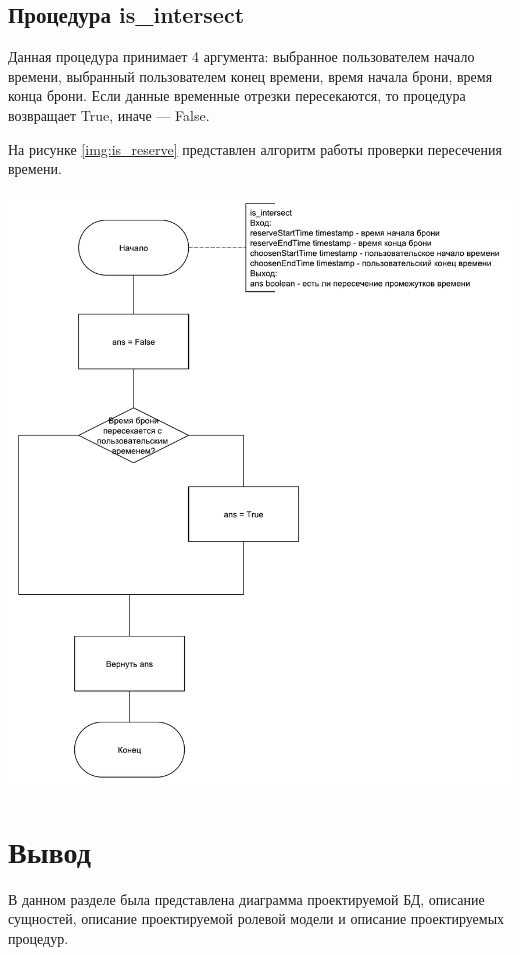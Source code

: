 \subsection{Процедура is\_intersect}
Данная процедура принимает 4 аргумента: выбранное пользователем начало времени, выбранный пользователем конец времени, время начала брони, время конца брони.
Если данные временные отрезки пересекаются, то процедура возвращает True, иначе --- False.

На рисунке \ref{img:is_reserve} представлен алгоритм работы проверки пересечения времени. 
\begin{center}
	\centering
	\includegraphics[height=0.65\textheight]{inc/img/is_intersect.pdf}
	\label{img:is_intersect}
\end{center}

\section*{Вывод}

В данном разделе была представлена диаграмма проектируемой БД, описание сущностей, описание проектируемой ролевой модели и описание проектируемых процедур.

